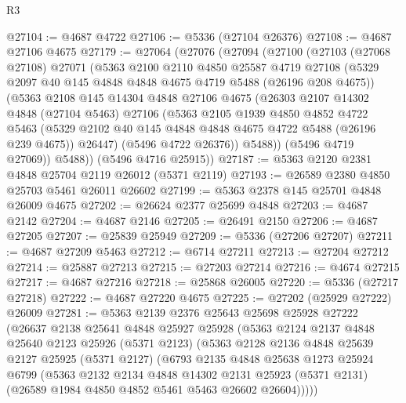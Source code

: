 \begin{lexlean}{R3}
\begin{coremodule}
@27104 := @4687 @4722
@27106 := @5336 (@27104 @26376)
@27108 := @4687 @27106 @4675
@27179 := @27064
    (@27076
      (@27094
        (@27100
          (@27103
            (@27068 @27108)
            @27071
            (@5363
              @2100
              @2110
              @4850
              @25587
              @4719
              @27108
              (@5329 @2097 @40 @145 @4848 @4848 @4675 @4719 @5488 (@26196 @208 @4675))
              (@5363
                @2108
                @145
                @14304
                @4848
                @27106
                @4675
                (@26303
                  @2107
                  @14302
                  @4848
                  (@27104 @5463)
                  @27106
                  (@5363
                    @2105
                    @1939
                    @4850
                    @4852
                    @4722
                    @5463
                    (@5329 @2102 @40 @145 @4848 @4848 @4675 @4722 @5488 (@26196 @239 @4675))
                    @26447)
                  (@5496 @4722 @26376))
                @5488))
            (@5496 @4719 @27069))
          @5488))
      (@5496 @4716 @25915))
@27187 := @5363 @2120 @2381 @4848 @25704 @2119 @26012 (@5371 @2119)
@27193 := @26589 @2380 @4850 @25703 @5461 @26011 @26602
@27199 := @5363 @2378 @145 @25701 @4848 @26009 @4675
@27202 := @26624 @2377 @25699 @4848
@27203 := @4687 @2142
@27204 := @4687 @2146
@27205 := @26491 @2150
@27206 := @4687 @27205
@27207 := @25839 @25949
@27209 := @5336 (@27206 @27207)
@27211 := @4687 @27209 @5463
@27212 := @6714 @27211
@27213 := @27204 @27212
@27214 := @25887 @27213
@27215 := @27203 @27214
@27216 := @4674 @27215
@27217 := @4687 @27216
@27218 := @25868 @26005
@27220 := @5336 (@27217 @27218)
@27222 := @4687 @27220 @4675
@27225 := @27202 (@25929 @27222) @26009
@27281 := @5363
    @2139
    @2376
    @25643
    @25698
    @25928
    @27222
    (@26637
      @2138
      @25641
      @4848
      @25927
      @25928
      (@5363
        @2124
        @2137
        @4848
        @25640
        @2123
        @25926
        (@5371 @2123)
        (@5363
          @2128
          @2136
          @4848
          @25639
          @2127
          @25925
          (@5371 @2127)
          (@6793
            @2135
            @4848
            @25638
            @1273
            @25924
            @6799
            (@5363
              @2132
              @2134
              @4848
              @14302
              @2131
              @25923
              (@5371 @2131)
              (@26589 @1984 @4850 @4852 @5461 @5463 @26602 @26604)))))

\end{coremodule}
\end{lexlean}
